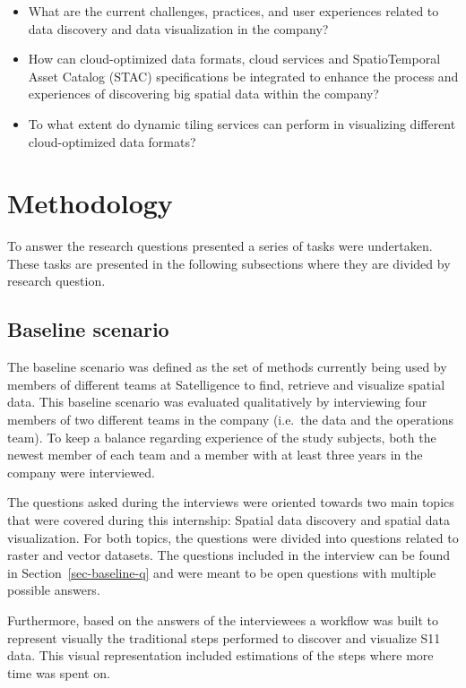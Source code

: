 \documentclass[
  oneside,
  open=any]{scrbook}
\providecommand{\tightlist}{%
  \setlength{\itemsep}{0pt}\setlength{\parskip}{0pt}}\usepackage{longtable,booktabs,array}
\begin{document}
\begin{itemize}
\tightlist
\item
  What are the current challenges, practices, and user experiences
  related to data discovery and data visualization in the company?
\item
  How can cloud-optimized data formats, cloud services and
  SpatioTemporal Asset Catalog (STAC) specifications be integrated to
  enhance the process and experiences of discovering big spatial data
  within the company?
\item
  To what extent do dynamic tiling services can perform in visualizing
  different cloud-optimized data formats?
\end{itemize}

\chapter{Methodology}\label{methodology}

To answer the research questions presented a series of tasks were
undertaken. These tasks are presented in the following subsections where
they are divided by research question.

\section{Baseline scenario}\label{baseline-scenario}

The baseline scenario was defined as the set of methods currently being
used by members of different teams at Satelligence to find, retrieve and
visualize spatial data. This baseline scenario was evaluated
qualitatively by interviewing four members of two different teams in the
company (i.e.~the data and the operations team). To keep a balance
regarding experience of the study subjects, both the newest member of
each team and a member with at least three years in the company were
interviewed.

The questions asked during the interviews were oriented towards two main
topics that were covered during this internship: Spatial data discovery
and spatial data visualization. For both topics, the questions were
divided into questions related to raster and vector datasets. The
questions included in the interview can be found in
Section~\ref{sec-baseline-q} and were meant to be open questions with
multiple possible answers.

Furthermore, based on the answers of the interviewees a workflow was
built to represent visually the traditional steps performed to discover
and visualize S11 data. This visual representation included estimations
of the steps where more time was spent on.
\end{document}
